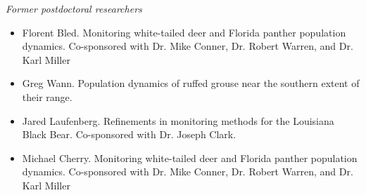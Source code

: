 


{\it Former postdoctoral researchers}
\begin{itemize}
   \item Florent Bled. Monitoring white-tailed deer and Florida panther
     population dynamics. Co-sponsored with Dr. Mike Conner,
     Dr. Robert Warren, and Dr. Karl Miller
   \item Greg Wann. Population dynamics of ruffed grouse near the
     southern extent of their range.  
   \item Jared Laufenberg. Refinements in
     monitoring methods for the Louisiana Black Bear. Co-sponsored
     with Dr. Joseph Clark.  
   \item Michael Cherry. Monitoring white-tailed deer and Florida panther
     population dynamics. Co-sponsored with Dr. Mike Conner,
     Dr. Robert Warren, and Dr. Karl Miller
\end{itemize}






